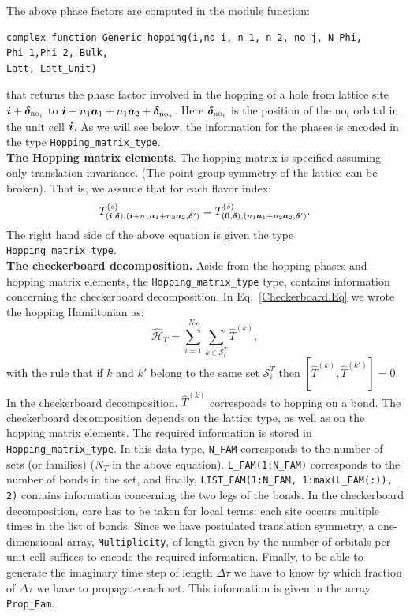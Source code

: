 The above phase factors are computed  in the   module function: 
\begin{lstlisting}[style=fortran]
complex function Generic_hopping(i,no_i, n_1, n_2, no_j, N_Phi, Phi_1,Phi_2, Bulk, 
Latt, Latt_Unit)
\end{lstlisting}
that  returns the  phase factor involved in the hopping of a hole from lattice site $ \boldsymbol{i} + \boldsymbol{\delta}_{\text{no}_i} $ to 
$\boldsymbol{i} + n_1 \boldsymbol{a}_1 + n_1 \boldsymbol{a}_2+ \boldsymbol{\delta}_{\text{no}_j}  $.  Here  $\boldsymbol{\delta}_{\text{no}_i}$  is  the position of the $\text{no}_i$  orbital in the unit cell
$\boldsymbol{i}$. 
As  we will see below, the information for the phases is encoded in  the type \texttt{Hopping\_matrix\_type}.\\

\noindent
\textbf{The  Hopping matrix elements}. 
The hopping matrix  is specified assuming only translation invariance.  (The point group symmetry of the lattice can be broken).    That is, we assume that  for  each flavor index: 
\begin{equation} 
T_{(\boldsymbol{i},\boldsymbol{\delta}), (\boldsymbol{i} +  n_1\boldsymbol{a}_1  + n_2 \boldsymbol{a}_2,\boldsymbol{\delta}')}^{(s)}   =   T^{(s)}_{(\boldsymbol{0},\boldsymbol{\delta}),  (n_1\boldsymbol{a}_1  + n_2 \boldsymbol{a}_2,\boldsymbol{\delta}') }.
\label{Hop.eq}	 
\end{equation}
The right  hand side of the above equation is given  the type  \texttt{Hopping\_matrix\_type}.\\


\noindent
\textbf{The checkerboard decomposition.}   Aside from the hopping phases and hopping matrix elements, the \texttt{Hopping\_matrix\_type} type, contains information  concerning the checkerboard   decomposition.  In Eq.~\ref{Checkerboard.Eq} we wrote the hopping Hamiltonian as:
\begin{equation}
\hat{\mathcal{H}}_{T}     = \sum_{i=1}^{N_T} \sum_{k \in \mathcal{S}^{T}_i} \hat{T}^{(k)},  
\end{equation}
with the rule that  if $k$ and $k'$  belong to the same set $\mathcal{S}^{T}_i $ then   $ \left[ \hat{T}^{(k)} , \hat{T}^{(k')} \right] = 0 $.  In the checkerboard decomposition, $\hat{T}^{(k)}$   corresponds to  hopping on a bond.    The checkerboard decomposition depends on the   lattice type, as well as on the hopping matrix elements.   The required  information is stored in  \texttt{Hopping\_matrix\_type}. In this data type,  \texttt{N\_FAM}  corresponds to the number of sets  (or families) ($N_T$ in the above equation). \texttt{L\_FAM(1:N\_FAM)}   corresponds to the number of bonds in the set,  and finally,  \texttt{LIST\_FAM(1:N\_FAM, 1:max(L\_FAM(:)), 2)}    contains  information concerning the two legs of the bonds.    In the checkerboard decomposition, care has to be taken for local terms: each site  occurs multiple times in the list of bonds.    Since we have postulated translation symmetry,    a one-dimensional array, \texttt{Multiplicity},  of length  given by  the number of orbitals per unit cell suffices to  encode the required information.  
Finally, to be able to generate  the imaginary time step of length $\Delta \tau$  we  have to know   by which fraction of  $\Delta \tau$   we have to propagate each set.  This information is given in  the array  \texttt{Prop\_Fam}.  

